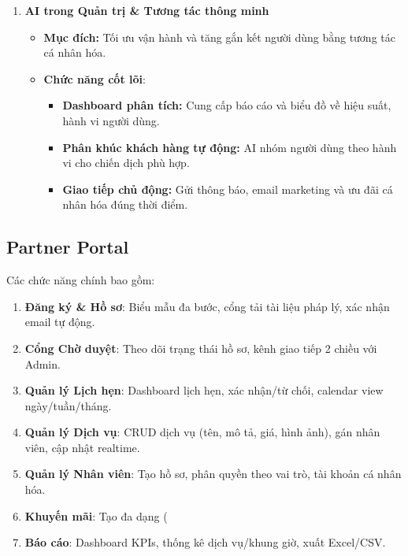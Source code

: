 \begin{enumerate}
\begin{itemize}
\begin{itemize}
            \item \textbf{Minh bạch thông tin:} Công khai đánh giá để hỗ trợ quyết định của người dùng.
        \end{itemize}
    \end{itemize}
    \item \textbf{AI trong Quản trị \& Tương tác thông minh}
    \begin{itemize}
        \item \textbf{Mục đích:} Tối ưu vận hành và tăng gắn kết người dùng bằng tương tác cá nhân hóa.
        \item \textbf{Chức năng cốt lõi}:
        \begin{itemize}
            \item \textbf{Dashboard phân tích:} Cung cấp báo cáo và biểu đồ về hiệu suất, hành vi người dùng.
            \item \textbf{Phân khúc khách hàng tự động:} AI nhóm người dùng theo hành vi cho chiến dịch phù hợp.
            \item \textbf{Giao tiếp chủ động:} Gửi thông báo, email marketing và ưu đãi cá nhân hóa đúng thời điểm.
        \end{itemize}
    \end{itemize}
\end{enumerate}

\subsection{Partner Portal}
Các chức năng chính bao gồm:
\begin{enumerate}
    \item \textbf{Đăng ký \& Hồ sơ}: Biểu mẫu đa bước, cổng tải tài liệu pháp lý, xác nhận email tự động.
    \item \textbf{Cổng Chờ duyệt}: Theo dõi trạng thái hồ sơ, kênh giao tiếp 2 chiều với Admin.
    \item \textbf{Quản lý Lịch hẹn}: Dashboard lịch hẹn, xác nhận/từ chối, calendar view ngày/tuần/tháng.
    \item \textbf{Quản lý Dịch vụ}: CRUD dịch vụ (tên, mô tả, giá, hình ảnh), gán nhân viên, cập nhật realtime.
    \item \textbf{Quản lý Nhân viên}: Tạo hồ sơ, phân quyền theo vai trò, tài khoản cá nhân hóa.
    \item \textbf{Khuyến mãi}: Tạo đa dạng (%
    \item \textbf{Báo cáo}: Dashboard KPIs, thống kê dịch vụ/khung giờ, xuất Excel/CSV.
\end{enumerate}

